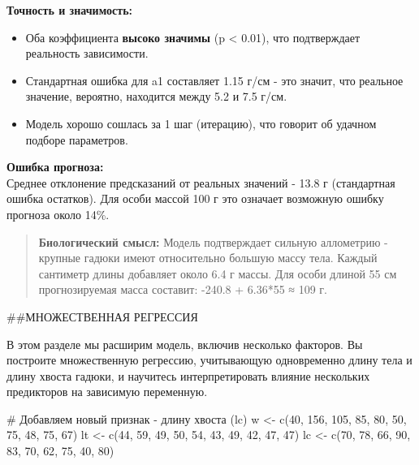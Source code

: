 \documentclass[
  letterpaper,
  DIV=11,
  numbers=noendperiod]{scrreprt}
\newenvironment{Shaded}{\begin{snugshade}}{\end{snugshade}}
\newcommand{\CommentTok}[1]{\textcolor[rgb]{0.37,0.37,0.37}{#1}}
\newcommand{\DecValTok}[1]{\textcolor[rgb]{0.68,0.00,0.00}{#1}}
\newcommand{\FunctionTok}[1]{\textcolor[rgb]{0.28,0.35,0.67}{#1}}
\newcommand{\NormalTok}[1]{\textcolor[rgb]{0.00,0.23,0.31}{#1}}
\newcommand{\OtherTok}[1]{\textcolor[rgb]{0.00,0.23,0.31}{#1}}
\begin{document}
\textbf{Точность и значимость:}

\begin{itemize}
\item
  Оба коэффициента \textbf{высоко значимы} (p \textless{} 0.01), что
  подтверждает реальность зависимости.
\item
  Стандартная ошибка для a1 составляет 1.15 г/см - это значит, что
  реальное значение, вероятно, находится между 5.2 и 7.5 г/см.
\item
  Модель хорошо сошлась за 1 шаг (итерацию), что говорит об удачном
  подборе параметров.
\end{itemize}

\textbf{Ошибка прогноза:}\\
Среднее отклонение предсказаний от реальных значений - 13.8 г
(стандартная ошибка остатков). Для особи массой 100 г это означает
возможную ошибку прогноза около 14\%.

\begin{quote}
\textbf{Биологический смысл:} Модель подтверждает сильную аллометрию -
крупные гадюки имеют относительно большую массу тела. Каждый сантиметр
длины добавляет около 6.4 г массы. Для особи длиной 55 см прогнозируемая
масса составит: -240.8 + 6.36*55 ≈ 109 г.
\end{quote}

\#\#МНОЖЕСТВЕННАЯ РЕГРЕССИЯ

В этом разделе мы расширим модель, включив несколько факторов. Вы
построите множественную регрессию, учитывающую одновременно длину тела и
длину хвоста гадюки, и научитесь интерпретировать влияние нескольких
предикторов на зависимую переменную.

\begin{Shaded}
\begin{Highlighting}[]
\CommentTok{\# Добавляем новый признак {-} длину хвоста (lc)}
\NormalTok{w }\OtherTok{\textless{}{-}} \FunctionTok{c}\NormalTok{(}\DecValTok{40}\NormalTok{, }\DecValTok{156}\NormalTok{, }\DecValTok{105}\NormalTok{, }\DecValTok{85}\NormalTok{, }\DecValTok{80}\NormalTok{, }\DecValTok{50}\NormalTok{, }\DecValTok{75}\NormalTok{, }\DecValTok{48}\NormalTok{, }\DecValTok{75}\NormalTok{, }\DecValTok{67}\NormalTok{)}
\NormalTok{lt }\OtherTok{\textless{}{-}} \FunctionTok{c}\NormalTok{(}\DecValTok{44}\NormalTok{, }\DecValTok{59}\NormalTok{, }\DecValTok{49}\NormalTok{, }\DecValTok{50}\NormalTok{, }\DecValTok{54}\NormalTok{, }\DecValTok{43}\NormalTok{, }\DecValTok{49}\NormalTok{, }\DecValTok{42}\NormalTok{, }\DecValTok{47}\NormalTok{, }\DecValTok{47}\NormalTok{)}
\NormalTok{lc }\OtherTok{\textless{}{-}} \FunctionTok{c}\NormalTok{(}\DecValTok{70}\NormalTok{, }\DecValTok{78}\NormalTok{, }\DecValTok{66}\NormalTok{, }\DecValTok{90}\NormalTok{, }\DecValTok{83}\NormalTok{, }\DecValTok{70}\NormalTok{, }\DecValTok{62}\NormalTok{, }\DecValTok{75}\NormalTok{, }\DecValTok{40}\NormalTok{, }\DecValTok{80}\NormalTok{)}
\end{Highlighting}
\end{Shaded}
\end{document}
